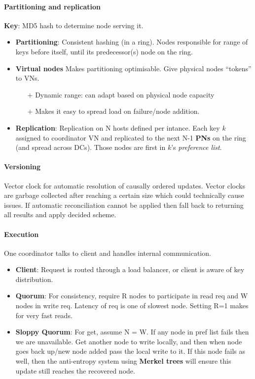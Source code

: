 \paragraph{Partitioning and replication} \textbf{Key}: MD5 hash to determine
node serving it.
\begin{itemize}
  \item \textbf{Partitioning}: Consistent hashing (in a ring). Nodes responsible
    for range of keys before itself, until its predecessor(s) node on the ring.
  \item \textbf{Virtual nodes} Makes partitioning optimisable. Give physical
    nodes ``tokens'' to VNs.
    \begin{itemize}
    \item[$+$] Dynamic range: can adapt based on physical node capacity
    \item[$+$] Makes it easy to spread load on failure/node addition.
    \end{itemize}
  \item \textbf{Replication}: Replication on N hosts defined per intance. Each
    key $k$ assigned to coordinator VN and replicated to the next N-1
    \textbf{PNs} on the ring (and spread across DCs). Those nodes are first in
    $k$'s \emph{preference list}.
\end{itemize}

\paragraph{Versioning} Vector clock for automatic resolution of causally ordered
updates. Vector clocks are garbage collected after reaching a certain size which
could technically cause issues. If automatic reconciliation cannot be applied
then fall back to returning all results and apply decided scheme.

\paragraph{Execution} One coordinator talks to client and handles internal
communication.
\begin{itemize}
\item \textbf{Client}: Request is routed through a load balancer, or client is
  aware of key distribution.
  \item \textbf{Quorum}: For consistency, require R nodes to participate in read
    req and W nodes in write req. Latency of req is one of slowest node. Setting
    R=1 makes for very fast reads.
  \item \textbf{Sloppy Quorum}: For get, assume N = W. If any node in pref list
    fails then we are unavailable. Get another node to write locally, and then
    when node goes back up/new node added pass the local write to it. If this
    node fails as well, then the anti-entropy system using \textbf{Merkel trees}
    will ensure this update still reaches the recovered node.
\end{itemize}

